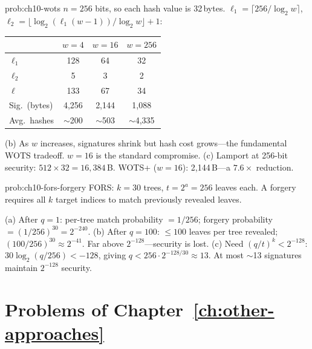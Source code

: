 \begin{sol}{prob:ch10-wots}
$n=256$ bits, so each hash value is 32\,bytes.  $\ell_1=\lceil 256/\log_2 w\rceil$, $\ell_2=\lfloor\log_2(\ell_1(w-1))/\log_2 w\rfloor+1$:

\medskip
\begin{tabular}{lccc}
\toprule
& $w=4$ & $w=16$ & $w=256$ \\
\midrule
$\ell_1$ & 128 & 64 & 32 \\
$\ell_2$ & 5 & 3 & 2 \\
$\ell$ & 133 & 67 & 34 \\
Sig.\ (bytes) & 4,256 & 2,144 & 1,088 \\
Avg.\ hashes & $\sim$200 & $\sim$503 & $\sim$4,335 \\
\bottomrule
\end{tabular}

\medskip
(b) As $w$ increases, signatures shrink but hash cost grows---the fundamental WOTS tradeoff.  $w=16$ is the standard compromise.
(c) Lamport at 256-bit security: $512\times 32=16{,}384$\,B.  WOTS+ ($w=16$): 2,144\,B---a $\mathbf{7.6\times}$ reduction.
\end{sol}

\begin{sol}{prob:ch10-fors-forgery}
FORS: $k=30$ trees, $t=2^a=256$ leaves each.  A forgery requires all $k$ target indices to match previously revealed leaves.

(a) After $q=1$: per-tree match probability $=1/256$; forgery probability $=(1/256)^{30}=2^{-240}$.
(b) After $q=100$: $\leq 100$ leaves per tree revealed; $(100/256)^{30}\approx 2^{-41}$.  Far above $2^{-128}$---security is lost.
(c) Need $(q/t)^k < 2^{-128}$: $30\log_2(q/256)<-128$, giving $q<256\cdot 2^{-128/30}\approx 13$.  At most $\sim$13 signatures maintain $2^{-128}$ security.
\end{sol}

\section*{Problems of Chapter~\ref{ch:other-approaches}}

